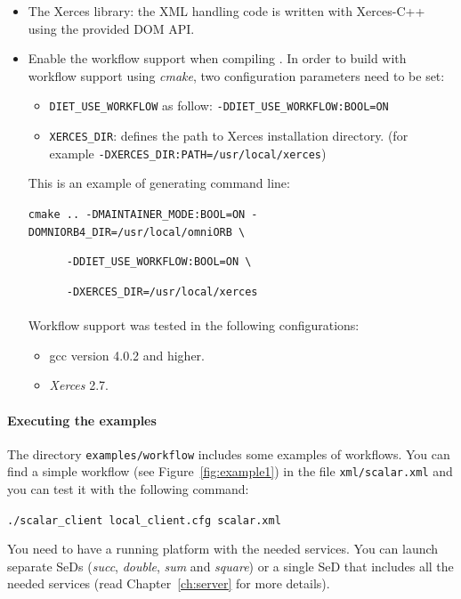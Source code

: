 \begin{itemize}
\item The Xerces library: the XML handling code is written with
  Xerces-C++ using the provided DOM API.
\item Enable the workflow support when compiling \diet. In order to build \diet with workflow support using \textit{cmake}, two
configuration parameters need to be set:

\begin{itemize}
\item \texttt{DIET\_USE\_WORKFLOW} as follow: \texttt{-DDIET\_USE\_WORKFLOW:BOOL=ON}
\item \texttt{XERCES\_DIR}: defines the path to Xerces installation directory.
  (for example \texttt{-DXERCES\_DIR:PATH=/usr/local/xerces})
\end{itemize}

This is an example of generating command line:

\verb|cmake .. -DMAINTAINER_MODE:BOOL=ON -DOMNIORB4_DIR=/usr/local/omniORB \|

\verb|      -DDIET_USE_WORKFLOW:BOOL=ON \|

\verb|      -DXERCES_DIR=/usr/local/xerces|


\paragraph{}
Workflow support was tested in the following configurations:

\begin{itemize}
\item gcc version 4.0.2 and higher.
\item \textit{Xerces} 2.7.
\end{itemize}
\end{itemize}

\paragraph{Executing the examples}

The directory \texttt{examples/workflow} includes some examples of
workflows.  You can find a simple workflow (see
Figure~\ref{fig:example1}) in the file \texttt{xml/scalar.xml} and you
can test it with the following command:

\verb|./scalar_client local_client.cfg scalar.xml |

You need to have a running \diet platform with the needed services. You
can launch separate SeDs (\textit{succ}, \textit{double}, \textit{sum}
and \textit{square}) or a single SeD that includes all the needed
services (read Chapter~\ref{ch:server} for more details).

